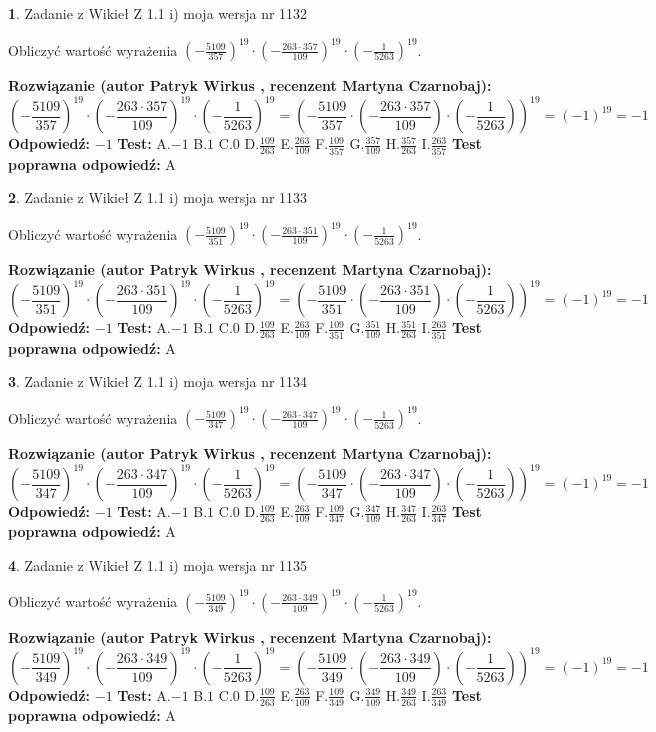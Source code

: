 \documentclass[12pt, a4paper]{article}
\theoremstyle{definition} %
\newtheorem{zad}{}
\newcommand{\zadStart}[1]{\begin{zad}#1\newline}
\newcommand{\zadStop}{\end{zad}}
\newcommand{\rozwStart}[2]{\noindent \textbf{Rozwiązanie (autor #1 , recenzent #2): }\newline}
\newcommand{\rozwStop}{\newline}
\newcommand{\odpStart}{\noindent \textbf{Odpowiedź:}\newline}
\newcommand{\odpStop}{\newline}
\newcommand{\testStart}{\noindent \textbf{Test:}\newline}
\newcommand{\testStop}{\newline}
\newcommand{\kluczStart}{\noindent \textbf{Test poprawna odpowiedź:}\newline}
\newcommand{\kluczStop}{\newline}
\begin{document}
\zadStart{Zadanie z Wikieł Z 1.1 i) moja wersja nr 1132}

Obliczyć wartość wyrażenia $(-\frac{5109}{357})^{19} \cdot (-\frac{263 \cdot 357}{109})^{19} \cdot (-\frac{1}{5263})^{19}$.
\zadStop
\rozwStart{Patryk Wirkus}{Martyna Czarnobaj}
$$(-\frac{5109}{357})^{19} \cdot (-\frac{263 \cdot 357}{109})^{19} \cdot (-\frac{1}{5263})^{19} = (-\frac{5109}{357} \cdot (-\frac{263 \cdot 357}{109}) \cdot (-\frac{1}{5263}))^{19} = (-1)^{19} = -1$$
\rozwStop
\odpStart
$-1$
\odpStop
\testStart
A.$-1$ B.$1$ C.$0$ D.$\frac{109}{263}$ E.$\frac{263}{109}$
F.$\frac{109}{357}$ G.$\frac{357}{109}$
H.$\frac{357}{263}$
I.$\frac{263}{357}$
\testStop
\kluczStart
A
\kluczStop



\zadStart{Zadanie z Wikieł Z 1.1 i) moja wersja nr 1133}

Obliczyć wartość wyrażenia $(-\frac{5109}{351})^{19} \cdot (-\frac{263 \cdot 351}{109})^{19} \cdot (-\frac{1}{5263})^{19}$.
\zadStop
\rozwStart{Patryk Wirkus}{Martyna Czarnobaj}
$$(-\frac{5109}{351})^{19} \cdot (-\frac{263 \cdot 351}{109})^{19} \cdot (-\frac{1}{5263})^{19} = (-\frac{5109}{351} \cdot (-\frac{263 \cdot 351}{109}) \cdot (-\frac{1}{5263}))^{19} = (-1)^{19} = -1$$
\rozwStop
\odpStart
$-1$
\odpStop
\testStart
A.$-1$ B.$1$ C.$0$ D.$\frac{109}{263}$ E.$\frac{263}{109}$
F.$\frac{109}{351}$ G.$\frac{351}{109}$
H.$\frac{351}{263}$
I.$\frac{263}{351}$
\testStop
\kluczStart
A
\kluczStop



\zadStart{Zadanie z Wikieł Z 1.1 i) moja wersja nr 1134}

Obliczyć wartość wyrażenia $(-\frac{5109}{347})^{19} \cdot (-\frac{263 \cdot 347}{109})^{19} \cdot (-\frac{1}{5263})^{19}$.
\zadStop
\rozwStart{Patryk Wirkus}{Martyna Czarnobaj}
$$(-\frac{5109}{347})^{19} \cdot (-\frac{263 \cdot 347}{109})^{19} \cdot (-\frac{1}{5263})^{19} = (-\frac{5109}{347} \cdot (-\frac{263 \cdot 347}{109}) \cdot (-\frac{1}{5263}))^{19} = (-1)^{19} = -1$$
\rozwStop
\odpStart
$-1$
\odpStop
\testStart
A.$-1$ B.$1$ C.$0$ D.$\frac{109}{263}$ E.$\frac{263}{109}$
F.$\frac{109}{347}$ G.$\frac{347}{109}$
H.$\frac{347}{263}$
I.$\frac{263}{347}$
\testStop
\kluczStart
A
\kluczStop



\zadStart{Zadanie z Wikieł Z 1.1 i) moja wersja nr 1135}

Obliczyć wartość wyrażenia $(-\frac{5109}{349})^{19} \cdot (-\frac{263 \cdot 349}{109})^{19} \cdot (-\frac{1}{5263})^{19}$.
\zadStop
\rozwStart{Patryk Wirkus}{Martyna Czarnobaj}
$$(-\frac{5109}{349})^{19} \cdot (-\frac{263 \cdot 349}{109})^{19} \cdot (-\frac{1}{5263})^{19} = (-\frac{5109}{349} \cdot (-\frac{263 \cdot 349}{109}) \cdot (-\frac{1}{5263}))^{19} = (-1)^{19} = -1$$
\rozwStop
\odpStart
$-1$
\odpStop
\testStart
A.$-1$ B.$1$ C.$0$ D.$\frac{109}{263}$ E.$\frac{263}{109}$
F.$\frac{109}{349}$ G.$\frac{349}{109}$
H.$\frac{349}{263}$
I.$\frac{263}{349}$
\testStop
\kluczStart
A
\kluczStop
\end{document}

